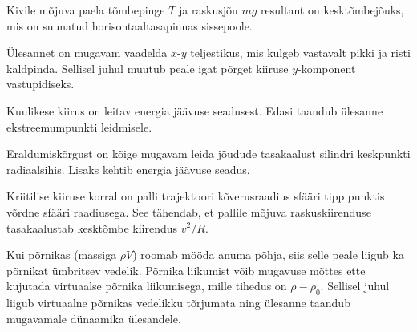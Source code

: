 \documentclass[10pt, twoside]{article}
\begin{document}
{%

\hint
Kivile mõjuva paela tõmbepinge $T$ ja raskusjõu $mg$ resultant on kesktõmbejõuks, mis on suunatud horisontaaltasapinnas sissepoole.
\probend
\bigskip


\hint
Ülesannet on mugavam vaadelda $x$-$y$ teljestikus, mis kulgeb vastavalt pikki ja risti kaldpinda. Sellisel juhul muutub peale igat põrget kiiruse $y$-komponent vastupidiseks.
\probend
\bigskip


\hint
Kuulikese kiirus on leitav energia jäävuse seadusest. Edasi taandub ülesanne ekstreemumpunkti leidmisele.
\probend
\bigskip


\hint
Eraldumiskõrgust on kõige mugavam leida jõudude tasakaalust silindri keskpunkti radiaalsihis. Lisaks kehtib energia jäävuse seadus.
\probend
\bigskip


\hint
Kriitilise kiiruse korral on palli trajektoori kõverusraadius sfääri tipp punktis võrdne sfääri raadiusega. See tähendab, et pallile mõjuva raskuskiirenduse tasakaalustab kesktõmbe kiirendus $v^2/R$.
\probend
\bigskip


\hint
Kui põrnikas (massiga $\rho V$) roomab mööda anuma põhja, siis selle peale liigub ka põrnikat ümbritsev vedelik. Põrnika liikumist võib mugavuse mõttes ette kujutada virtuaalse põrnika liikumisega, mille tihedus on $\rho - \rho_0$. Sellisel juhul liigub virtuaalne põrnikas vedelikku tõrjumata ning ülesanne taandub mugavamale dünaamika ülesandele.
\probend
\bigskip


}
\end{document}
